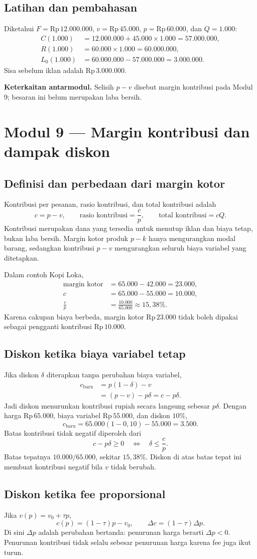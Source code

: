 \documentclass[11pt,a4paper]{article}
\newcommand{\modul}[2]{\clearpage\section{Modul #1 --- #2}}
\newcommand{\bagian}[1]{\Needspace{5\baselineskip}\subsection{#1}}
\newcommand{\jembatan}[1]{\par\textbf{Keterkaitan antarmodul.} #1\par}
\newcommand{\rp}[1]{\ensuremath{\mathrm{Rp}\,#1}}
\begin{document}
\bagian{Latihan dan pembahasan}
Diketahui \(F=\rp{12.000.000}\), \(v=\rp{45.000}\), \(p=\rp{60.000}\), dan \(Q=1.000\):
\[
\begin{aligned}
C(1.000)&=12.000.000+45.000\times1.000=57.000.000,\\
R(1.000)&=60.000\times1.000=60.000.000,\\
L_0(1.000)&=60.000.000-57.000.000=3.000.000.
\end{aligned}
\]
Sisa sebelum iklan adalah \rp{3.000.000}.
\jembatan{Selisih \(p-v\) disebut margin kontribusi pada Modul 9; besaran ini belum merupakan laba bersih.}

\modul{9}{Margin kontribusi dan dampak diskon}
\bagian{Definisi dan perbedaan dari margin kotor}
Kontribusi per pesanan, rasio kontribusi, dan total kontribusi adalah
\[
c=p-v,\qquad \text{rasio kontribusi}=\frac{c}{p},\qquad
\text{total kontribusi}=cQ.
\]
Kontribusi merupakan dana yang tersedia untuk menutup iklan dan biaya tetap, bukan laba bersih. Margin kotor produk \(p-k\) hanya mengurangkan modal barang, sedangkan kontribusi \(p-v\) mengurangkan seluruh biaya variabel yang ditetapkan.

Dalam contoh Kopi Loka,
\[
\begin{aligned}
\text{margin kotor}&=65.000-42.000=23.000,\\
c&=65.000-55.000=10.000,\\
\frac{c}{p}&=\frac{10.000}{65.000}\approx15{,}38\%.
\end{aligned}
\]
Karena cakupan biaya berbeda, margin kotor \rp{23.000} tidak boleh dipakai sebagai pengganti kontribusi \rp{10.000}.

\bagian{Diskon ketika biaya variabel tetap}
Jika diskon \(\delta\) diterapkan tanpa perubahan biaya variabel,
\[
\begin{aligned}
c_{\text{baru}}&=p(1-\delta)-v\\
&=(p-v)-p\delta=c-p\delta.
\end{aligned}
\]
Jadi diskon menurunkan kontribusi rupiah secara langsung sebesar \(p\delta\). Dengan harga \rp{65.000}, biaya variabel \rp{55.000}, dan diskon \(10\%\),
\[
c_{\text{baru}}=65.000(1-0{,}10)-55.000=3.500.
\]
Batas kontribusi tidak negatif diperoleh dari
\[
c-p\delta\ge0\quad\Longleftrightarrow\quad \delta\le\frac{c}{p}.
\]
Batas tepatnya \(10.000/65.000\), sekitar \(15{,}38\%\). Diskon di atas batas tepat ini membuat kontribusi negatif bila \(v\) tidak berubah.

\bagian{Diskon ketika fee proporsional}
Jika \(v(p)=v_0+\tau p\),
\[
c(p)=(1-\tau)p-v_0,\qquad \Delta c=(1-\tau)\Delta p.
\]
Di sini \(\Delta p\) adalah perubahan bertanda: penurunan harga berarti \(\Delta p<0\). Penurunan kontribusi tidak selalu sebesar penurunan harga karena fee juga ikut turun.
\end{document}
